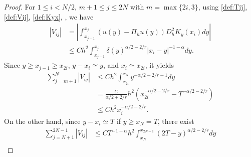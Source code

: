 \documentclass{amsart}
\theoremstyle{definition}
\theoremstyle{remark}
\numberwithin{equation}{section}
\begin{document}
\begin{proof}
  For $1\le i < N/2$, $m+1 \le j \le 2N$ with \(m=\max\{2i, 3\}\),
  using \eqref{def:Tij}, \eqref{def:Vij}, \eqref{def:Kyx}, , we have
  \begin{equation*}
    \begin{aligned}
      | V_{ij}| 
      & =  \left| \int_{x_{j-1}}^{x_{j}}\left( u(y) - \Pi_hu(y)\right) D_h^2 K_y (x_i) dy \right|  \\
      & \le C h^2 \int_{x_{j-1}}^{x_{j}} \delta(y)^{\alpha/2-2/r} |x_i-y|^{-1-\alpha} dy.
    \end{aligned}
  \end{equation*}
  Since $y\ge x_{j-1} \ge x_{2i}$, $ y - x_i \simeq y$, and \(x_{i} \simeq x_{2i} \), it yields
  \begin{equation*}
    \begin{aligned}
      \sum_{j=m+1}^{N} |V_{ij}|
        & \le C h^2 \int_{x_{2i}}^{x_{N}} y^{-\alpha/2-2/r-1} dy                     \\
        & = \frac{C}{\alpha/2+2/r} h^2 ( x_{2i}^{-\alpha/2-2/r} - T^{-\alpha/2-2/r}) \\
        & \le C h^2 x_i^{-\alpha/2-2/r}.
    \end{aligned}
  \end{equation*}
  On the other hand, since $y-x_i \simeq T$ if $y\ge x_N = T$, there exist
  \begin{equation*}
    \begin{aligned}
      \sum_{j=N+1}^{2N-1} |V_{ij}|
       & \le C T^{-1-\alpha} h^2 \int_{x_{N}}^{x_{2N-1}} (2T-y)^{\alpha/2-2/r}  dy                       \\

\end{aligned}
\end{equation*}
\end{proof}
\end{document}
